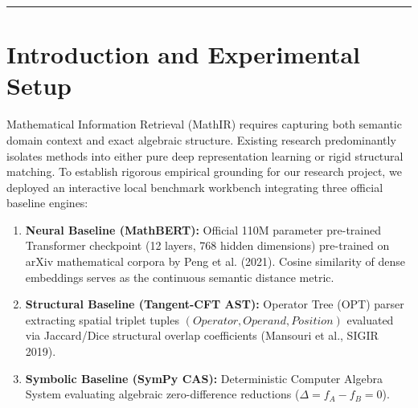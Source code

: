\documentclass[11pt,a4paper]{article}
\begin{document}
	\vspace{0.4em}
	\hrule
	\vspace{0.8em}
	
	\begin{abstract}
		In this empirical progress report, Group 2 investigates the practical retrieval boundaries of three established paradigms in Mathematical Information Retrieval (MathIR): pre-trained neural language models (MathBERT), tree-based structural embeddings (Tangent-CFT), and symbolic computer algebra systems (SymPy CAS). Through an interactive adversarial test suite running on live weights, we primarily dissect the critical failure modes of deep neural transformers. Our findings demonstrate that MathBERT exhibits severe semantic blindness to polarity reversals ($x > 0$ vs. $x < 0$ at 93.0\% similarity), fraction inversions ($\frac{x}{y}$ vs. $\frac{y}{x}$ at 99.0\%), algebraic misconceptions ($(a+b)^2$ vs. $a^2+b^2$ at 93.4\%), and orthogonal trigonometric functions ($\sin(x)$ vs. $\cos(x)$ at 93.6\%), while experiencing a sharp degradation when processing Vietnamese mathematical statements (dropping to 57.6\%). Furthermore, when handling informal sequence statements ($1+2+..+n$), CAS suffers catastrophic syntax crashes. Consequently, we formulate a multi-stage Neuro-Symbolic Hybrid architecture that cascades neural semantic recall with structural verification filters.
	\end{abstract}

	\section{Introduction and Experimental Setup}
	Mathematical Information Retrieval (MathIR) requires capturing both semantic domain context and exact algebraic structure. Existing research predominantly isolates methods into either pure deep representation learning or rigid structural matching. To establish rigorous empirical grounding for our research project, we deployed an interactive local benchmark workbench integrating three official baseline engines:
	
	\begin{enumerate}
		\item \textbf{Neural Baseline (MathBERT):} Official 110M parameter pre-trained Transformer checkpoint (12 layers, 768 hidden dimensions) pre-trained on arXiv mathematical corpora by Peng et al. (2021). Cosine similarity of dense embeddings serves as the continuous semantic distance metric.
		\item \textbf{Structural Baseline (Tangent-CFT AST):} Operator Tree (OPT) parser extracting spatial triplet tuples $(Operator, Operand, Position)$ evaluated via Jaccard/Dice structural overlap coefficients (Mansouri et al., SIGIR 2019).
		\item \textbf{Symbolic Baseline (SymPy CAS):} Deterministic Computer Algebra System evaluating algebraic zero-difference reductions ($\Delta = f_A - f_B = 0$).
	\end{enumerate}
\end{document}

